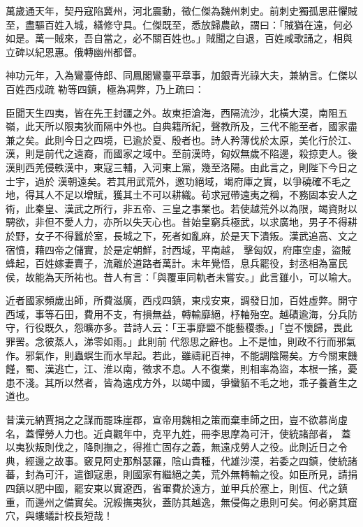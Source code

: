 \begin{pinyinscope}
 萬歲通天年，契丹寇陷冀州，河北震動，徵仁傑為魏州刺史。前刺史獨孤思莊懼賊至，盡驅百姓入城，繕修守具。仁傑既至，悉放歸農畝，謂曰：「賊猶在遠，何必如是。萬一賊來，吾自當之，必不關百姓也。」賊聞之自退，百姓咸歌誦之，相與立碑以紀恩惠。俄轉幽州都督。



 神功元年，入為鸞臺侍郎、同鳳閣鸞臺平章事，加銀青光祿大夫，兼納言。仁傑以百姓西戍疏
 勒等四鎮，極為凋弊，乃上疏曰：



 臣聞天生四夷，皆在先王封疆之外。故東拒滄海，西隔流沙，北橫大漠，南阻五嶺，此天所以限夷狄而隔中外也。自典籍所紀，聲教所及，三代不能至者，國家盡兼之矣。此則今日之四境，已逾於夏、殷者也。詩人矜薄伐於太原，美化行於江、漢，則是前代之遠裔，而國家之域中。至前漢時，匈奴無歲不陷邊，殺掠吏人。後漢則西羌侵軼漢中，東寇三輔，入河東上黨，幾至洛陽。由此言之，則陛下今日之士宇，過於
 漢朝遠矣。若其用武荒外，邀功絕域，竭府庫之實，以爭磽確不毛之地，得其人不足以增賦，獲其土不可以耕織。茍求冠帶遠夷之稱，不務固本安人之術，此秦皇、漢武之所行，非五帝、三皇之事業也。若使越荒外以為限，竭資財以騁欲，非但不愛人力，亦所以失天心也。昔始皇窮兵極武，以求廣地，男子不得耕於野，女子不得蠶於室，長城之下，死者如亂麻，於是天下潰叛。漢武追高、文之宿憤，藉四帝之儲實，於是定朝鮮，討西域，平南越，
 擊匈奴，府庫空虛，盜賊蜂起，百姓嫁妻賣子，流離於道路者萬計。末年覺悟，息兵罷役，封丞相為富民侯，故能為天所祐也。昔人有言：「與覆車同軌者未嘗安。」此言雖小，可以喻大。



 近者國家頻歲出師，所費滋廣，西戍四鎮，東戍安東，調發日加，百姓虛弊。開守西域，事等石田，費用不支，有損無益，轉輸靡絕，杼軸殆空。越磧逾海，分兵防守，行役既久，怨曠亦多。昔詩人云：「王事靡盬不能藝稷黍。」「豈不懷歸，畏此罪罟。念彼蒸人，涕零如雨。」此則前
 代怨思之辭也。上不是恤，則政不行而邪氣作。邪氣作，則蟲螟生而水旱起。若此，雖禱祀百神，不能調陰陽矣。方今關東饑饉，蜀、漢逃亡，江、淮以南，徵求不息。人不復業，則相率為盜，本根一搖，憂患不淺。其所以然者，皆為遠戍方外，以竭中國，爭蠻貊不毛之地，乖子養蒼生之道也。



 昔漢元納賈捐之之謀而罷珠崖郡，宣帝用魏相之策而棄車師之田，豈不欲慕尚虛名，蓋憚勞人力也。近貞觀年中，克平九姓，冊李思摩為可汗，使統諸部者，
 蓋以夷狄叛則伐之，降則撫之，得推亡固存之義，無遠戍勞人之役。此則近日之令典，經邊之故事。竅見阿史那斛瑟羅，陰山貴種，代雄沙漠，若委之四鎮，使統諸蕃，封為可汗，遣御寇患，則國家有繼絕之美，荒外無轉輸之役。如臣所見，請捐四鎮以肥中國，罷安東以實遼西，省軍費於遠方，並甲兵於塞上，則恆、代之鎮重，而邊州之備實矣。況綏撫夷狄，蓋防其越逸，無侵侮之患則可矣。何必窮其窟穴，與螻蟻計校長短哉！




\end{pinyinscope}
